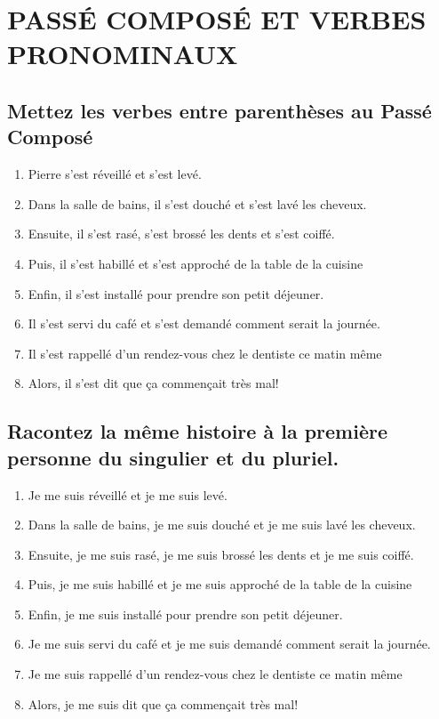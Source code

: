\section{PASSÉ COMPOSÉ ET VERBES PRONOMINAUX}

\subsection{Mettez les verbes entre parenthèses au Passé Composé}

\begin{enumerate}
    \item Pierre s'est réveillé et s'est levé.
    \item Dans la salle de bains, il s'est douché et s'est lavé les cheveux.
    \item Ensuite, il s'est rasé, s'est brossé les dents et s'est coiffé.
    \item Puis, il s'est habillé et s'est approché de la table de la cuisine
    \item Enfin, il s'est installé pour prendre son petit déjeuner.
    \item Il s'est servi du café et s'est demandé comment serait la journée.
    \item Il s'est rappellé d'un rendez-vous chez le dentiste ce matin même
    \item Alors, il s'est dit que ça commençait très mal!
\end{enumerate}

\subsection{Racontez la même histoire à la première personne du singulier et du pluriel.}

\begin{enumerate}
    \item Je me suis réveillé et je me suis levé.
    \item Dans la salle de bains, je me suis douché et je me suis lavé les cheveux.
    \item Ensuite, je me suis rasé, je me suis brossé les dents et je me suis coiffé.
    \item Puis, je me suis habillé et je me suis approché de la table de la cuisine
    \item Enfin, je me suis installé pour prendre son petit déjeuner.
    \item Je me suis servi du café et je me suis demandé comment serait la journée.
    \item Je me suis rappellé d'un rendez-vous chez le dentiste ce matin même
    \item Alors, je me suis dit que ça commençait très mal!
\end{enumerate}

